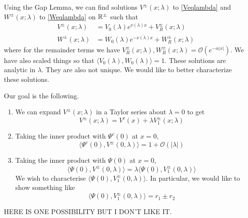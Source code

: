 \documentclass[thesis.tex]{subfiles}
\begin{document}
Using the Gap Lemma, we can find solutions $V^\pm(x; \lambda)$ to \eqref{Veqlambda} and $W^\pm(x; \lambda)$ to \eqref{Weqlambda} on $\mathbb{R}^\pm$ such that
\begin{align}
V^\pm(x; \lambda) &= V_0(\lambda)e^{\nu(\lambda)x} + V_R^\pm(x; \lambda) \label{Vpm} \\
W^\pm(x; \lambda) &= W_0(\lambda)e^{-\overline{\nu(\lambda)}x} + W_R^\pm(x; \lambda) \label{Vpm}
\end{align}
where for the remainder terms we have $V_R^\pm(x; \lambda), W_R^\pm(x; \lambda) = \mathcal{O}(e^{-\alpha |x|})$. We have also scaled things so that $\langle V_0(\lambda), W_0(\lambda) \rangle = 1$. These solutions are analytic in $\lambda$. They are also not unique. We would like to better characterize these solutions. 

Our goal is the following.
\begin{enumerate}
	\item We can expand $V^\pm(x; \lambda)$ in a Taylor series about $\lambda = 0$ to get
	\[
	V^\pm(x; \lambda) = V^c(x) + \lambda V_1^\pm(x; \lambda)
	\]
	\item Taking the inner product with $\Psi^c(0)$ at $x = 0$,
	\[
	\langle \Psi^c(0), V^\pm(0, \lambda) \rangle = 1 + \mathcal{O}(|\lambda|) 
	\]
	\item Taking the inner product with $\Psi(0)$ at $x = 0$,
	\[
	\langle \Psi(0), V^\pm(0, \lambda) \rangle = \lambda \langle \Psi(0), V_1^\pm(0, \lambda) \rangle
	\]
	We wish to characterise $\langle \Psi(0), V_1^\pm(0, \lambda) \rangle$. In particular, we would like to show something like
	\[
	\langle \Psi(0), V_1^\pm(0, \lambda) \rangle = 
	r_1 \pm r_2
	\]
\end{enumerate}

HERE IS ONE POSSIBILITY BUT I DON'T LIKE IT.
\end{document}
